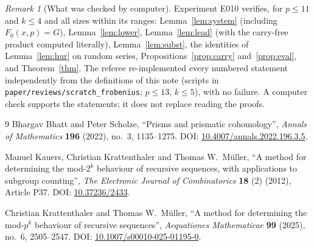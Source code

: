 \documentclass[11pt]{article}
\theoremstyle{definition}
\theoremstyle{remark}
\newtheorem{remark}[theorem]{Remark}
\begin{document}
\begin{remark}[What was checked by computer]
Experiment E010 verifies, for $p\le11$ and $k\le4$ and all sizes within its ranges:
Lemma~\ref{lem:system} (including $F_0(x,p)=G$), Lemma~\ref{lem:lower},
Lemma~\ref{lem:lead} (with the carry-free product computed literally),
Lemma~\ref{lem:subst}, the identities of Lemma~\ref{lem:hur} on random series,
Propositions~\ref{prop:carry} and~\ref{prop:eval}, and Theorem~\ref{thm}. The referee
re-implemented every numbered statement independently from the definitions of this note
(scripts in \texttt{paper/reviews/scratch\_frobenius}; $p\le13$, $k\le5$), with no failure.
A computer check supports the statements; it does not replace reading the proofs.
\end{remark}

\begin{thebibliography}{9}
Bhargav Bhatt and Peter Scholze, ``Prisms and prismatic cohomology'', \emph{Annals of
Mathematics} \textbf{196} (2022), no.~3, 1135--1275. DOI:
\href{https://doi.org/10.4007/annals.2022.196.3.5}{10.4007/annals.2022.196.3.5}.

Manuel Kauers, Christian Krattenthaler and Thomas W.\ M\"uller, ``A method for determining
the mod-$2^k$ behaviour of recursive sequences, with applications to subgroup counting'',
\emph{The Electronic Journal of Combinatorics} \textbf{18} (2) (2012), Article P37. DOI:
\href{https://doi.org/10.37236/2433}{10.37236/2433}.

Christian Krattenthaler and Thomas W.\ M\"uller, ``A method for determining the
mod-$p^k$ behaviour of recursive sequences'', \emph{Aequationes Mathematicae} \textbf{99}
(2025), no.~6, 2505--2547. DOI:
\href{https://doi.org/10.1007/s00010-025-01195-0}{10.1007/s00010-025-01195-0}.
\end{thebibliography}
\end{document}
